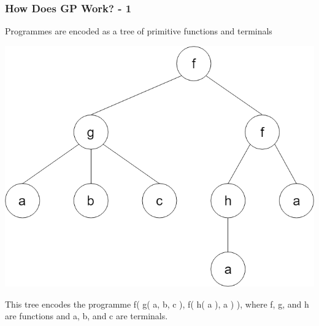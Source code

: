 \documentclass{beamer}
\begin{document}
		\begin{frame}
		
			\frametitle{How Does GP Work? - 1}
			
			Programmes are encoded as a tree of primitive functions and terminals
			
			\begin{center}
				
				\includegraphics[scale=0.2]{resources/1_gp_example_tree}
				
				This tree encodes the programme f( g( a, b, c ), f( h( a ), a ) ), where f, g, and h are functions and a, b, and c are terminals.
				
			\end{center}
			
			
		
		\end{frame}
	
\end{document}
